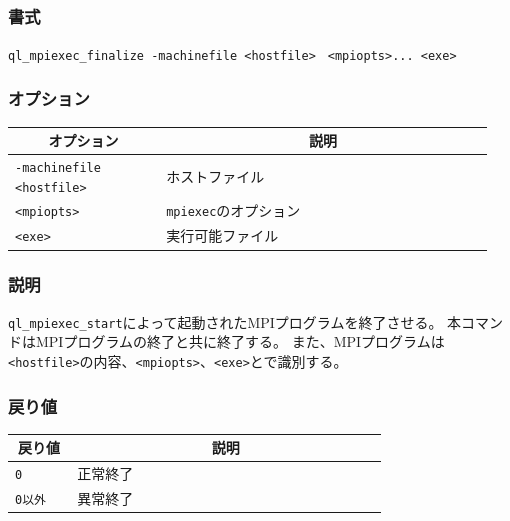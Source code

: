 \documentclass[twoside,11pt,fleqn]{book}
\begin{document}
\subsection{}
\subsubsection*{書式}{\quad} \texttt{ql\_mpiexec\_finalize -machinefile <hostfile>　{\lbrack}<mpiopts>...{\rbrack}  <exe> }
\subsubsection*{オプション}{\quad}
\begin{table}[!ht]
\footnotesize
\begin{tabular}{|p{0.30\linewidth}|p{0.65\linewidth}|} \hline
\multicolumn{1}{|c}{\textbf{オプション}}&\multicolumn{1}{|c|}{\textbf{説明}}\\ \hline \hline
\texttt{-machinefile <hostfile>}&ホストファイル\\ \hline
\texttt{<mpiopts>}&\texttt{mpiexec}のオプション\\ \hline
\texttt{<exe>}&実行可能ファイル\\ \hline
\end{tabular}
\vspace{-0em}
\end{table}
\FloatBarrier
\subsubsection*{説明}{\quad}
\texttt{ql\_mpiexec\_start}によって起動されたMPIプログラムを終了させる。
本コマンドはMPIプログラムの終了と共に終了する。
また、MPIプログラムは\texttt{<hostfile>}の内容、\texttt{<mpiopts>}、\texttt{<exe>}とで識別する。


\subsubsection*{戻り値}{\quad}
\begin{table}[!h]
\footnotesize
\begin{tabular}{|p{0.15\linewidth}|p{0.75\linewidth}|} \hline
\multicolumn{1}{|c}{\textbf{戻り値}}&\multicolumn{1}{|c|}{\textbf{説明}}\\ \hline \hline
\texttt{0}&正常終了\\ \hline
\texttt{0以外}&異常終了\\ \hline
\end{tabular}
\vspace{-0em}
\end{table}
\FloatBarrier
\end{document}
